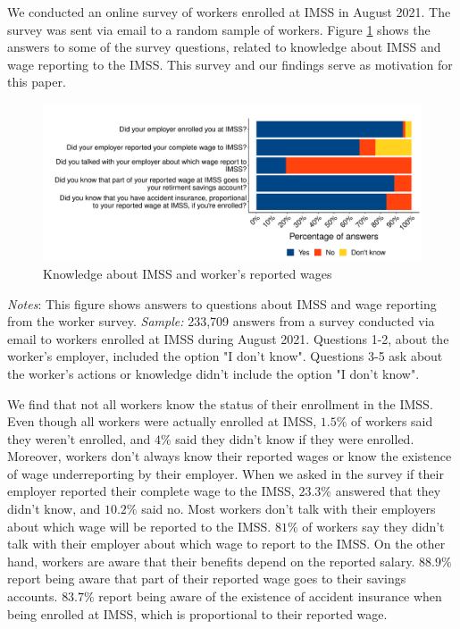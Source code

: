 \documentclass[10pt, oneside]{book}
\begin{document}
We conducted an online survey of workers enrolled at IMSS in August 2021. The survey was sent via email to a random sample of workers. Figure \ref{fig:hist_knowledge_register_survey} shows the answers to some of the survey questions, related to knowledge about IMSS and wage reporting to the IMSS. This survey and our findings serve as motivation for this paper. \\

\begin{figure}[H]
    \centering
    \caption{Knowledge about IMSS and worker's reported wages \label{fig:hist_knowledge_register_survey}}
    \includegraphics[width=\textwidth]{04_Figures/worker_survey/hist_knowledge_register_survey.pdf}
\end{figure}
\scriptsize{\textit{Notes}: This figure shows answers to questions about IMSS and wage reporting from the worker survey. \textit{Sample:} 233,709 answers from a survey conducted via email to workers enrolled at IMSS during August 2021. Questions 1-2, about the worker's employer, included the option "I don't know". Questions 3-5 ask about the worker's actions or knowledge didn't include the option "I don't know".
} \\

\normalsize

We find that not all workers know the status of their enrollment in the IMSS. Even though all workers were actually enrolled at IMSS, $1.5\%$ of workers said they weren't enrolled, and $4\%$ said they didn't know if they were enrolled. Moreover, workers don't always know their reported wages or know the existence of wage underreporting by their employer. When we asked in the survey if their employer reported their complete wage to the IMSS, $23.3\%$ answered that they didn't know, and $10.2\%$ said no. Most workers don't talk with their employers about which wage will be reported to the IMSS. $81\%$ of workers say they didn't talk with their employer about which wage to report to the IMSS. On the other hand, workers are aware that their benefits depend on the reported salary. $88.9\%$ report being aware that part of their reported wage goes to their savings accounts. $83.7\%$ report being aware of the existence of accident insurance when being enrolled at IMSS, which is proportional to their reported wage. \\
\end{document}
